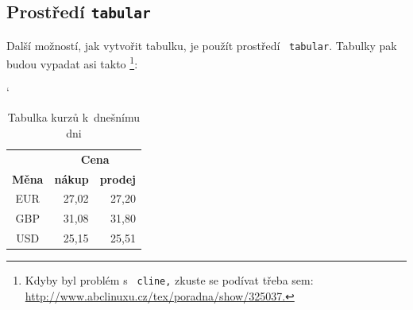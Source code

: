 \documentclass[a4paper,11pt, titlepage]{article}
\begin{document}
\subsection{Prostředí \texttt{tabular}}
Další možností, jak vytvořit tabulku, je použít prostředí \ \texttt{tabular}. Tabulky pak budou vypadat asi takto \footnote{Kdyby byl problém s \texttt{ cline,} zkuste se podívat třeba sem: \href{http://www.abclinuxu.cz/tex/poradna/show/325037}{http://www.abclinuxu.cz/tex/poradna/show/325037.}}:

\bigskip

\begin{table}[h]
\begin{center}
\catcode` 
\begin{tabular}{|c|r|r|} \hline
    & \multicolumn{2}{|c|}{\textbf{Cena}}\\\cline{2-3}
    \textbf{Měna} & \textbf{nákup} & \textbf{prodej}\\ \hline
    EUR & 27,02 & 27,20\\
    GBP & 31,08 & 31,80\\
    USD & 25,15 & 25,51\\ \hline
\end{tabular}
\caption{Tabulka kurzů k~dnešnímu dni}
\label{KurzTab}
\end{center}
\end{table}

\bigskip
\end{document}
